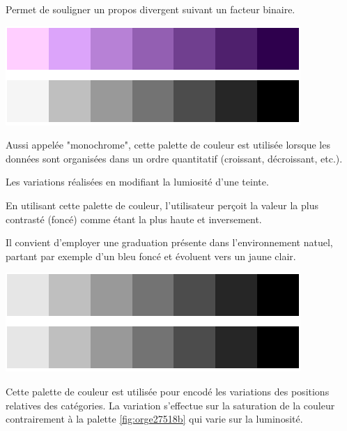 \documentclass[a4paper,12pt]{article}
\begin{document}
\begin{multicols}{2}
Permet de souligner un propos divergent suivant un facteur binaire.\autocite{jonathanschwabishDevelopingDataVisualization2021} 


\begin{center}
\includegraphics[width=.9\linewidth]{./img/palette-monochrome.pdf}
\end{center}

Aussi appelée "monochrome", cette palette de couleur est utilisée lorsque les données sont organisées dans un ordre quantitatif (croissant, décroissant, etc.). \autocite{wilkeColorScales2019,jonathanschwabishDevelopingDataVisualization2021}

Les variations réalisées en modifiant la lumiosité d'une teinte.\autocite{andreaskrauseBestPracticesData2024} 

En utilisant cette palette de couleur, l'utilisateur perçoit la valeur la plus contrasté (foncé) comme étant la plus haute et inversement. \autocite{kirkDataRepresentation2019}

Il convient d'employer une graduation présente dans l'environnement natuel, partant par exemple d'un bleu foncé et évoluent vers un jaune clair. \autocite{wilkeColorScales2019}


\begin{center}
\includegraphics[width=.9\linewidth]{./img/palette-ranking.pdf}
\end{center}

Cette palette de couleur est utilisée pour encodé les variations des positions relatives des catégories. La variation s'effectue sur la saturation de la couleur contrairement à la palette \ref{fig:orge27518b} qui varie sur la luminosité.


\end{multicols}
\end{document}
